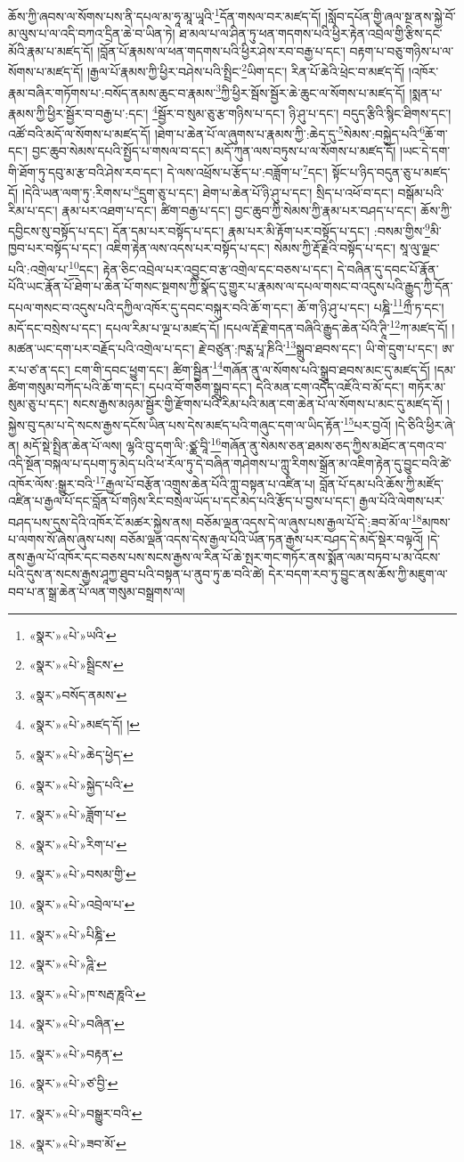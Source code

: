 ཆོས་ཀྱི་ཞབས་ལ་སོགས་པས་ནི་དཔལ་མ་ཧཱ་མཱ་ཡཱའི་\footnote{«སྣར་»«པེ་»ཡའི་}དོན་གསལ་བར་མཛད་དོ། །སློབ་དཔོན་གྱི་ཞལ་སྔ་ནས་སྐྱེ་བོ་མ་ལུས་པ་ལ་འདི་བཀའ་དྲིན་ཆེ་བ་ཡིན་ཏེ། ཐ་མལ་པ་ལ་ཤིན་ཏུ་ཕན་གདགས་པའི་ཕྱིར་རྟེན་འབྲེལ་གྱི་རྩིས་དང་མོའི་རྣམ་པ་མཛད་དོ། །བློན་པོ་རྣམས་ལ་ཕན་གདགས་པའི་ཕྱིར་ཤེས་རབ་བརྒྱ་པ་དང་། བརྟག་པ་བཅུ་གཉིས་པ་ལ་སོགས་པ་མཛད་དོ། །རྒྱལ་པོ་རྣམས་ཀྱི་ཕྱིར་བཤེས་པའི་སྤྲིང་\footnote{«སྣར་»«པེ་»སྦྲིངས་}ཡིག་དང་། རིན་པོ་ཆེའི་ཕྲེང་བ་མཛད་དོ། །འཁོར་རྣམ་བཞིར་གཏོགས་པ་:བསོད་ནམས་ཆུང་བ་རྣམས་\footnote{«སྣར་»བསོད་ནམས་}ཀྱི་ཕྱིར་སྦོས་སྦྱོར་ཆེ་ཆུང་ལ་སོགས་པ་མཛད་དོ། །སྨན་པ་རྣམས་ཀྱི་ཕྱིར་སྦྱོར་བ་བརྒྱ་པ་:དང་། \footnote{«སྣར་»«པེ་»མཛད་དོ། ། }སྦྱོར་བ་སུམ་ཅུ་རྩ་གཉིས་པ་དང་། ཉི་ཤུ་པ་དང་། བདུད་རྩིའི་སྙིང་ཐིགས་དང་། འཚོ་བའི་མདོ་ལ་སོགས་པ་མཛད་དོ། །ཐེག་པ་ཆེན་པོ་ལ་ཞུགས་པ་རྣམས་ཀྱི་:ཆེད་དུ་\footnote{«སྣར་»«པེ་»ཆེད་ཕྱེད་}སེམས་:བསྐྱེད་པའི་\footnote{«སྣར་»«པེ་»སྐྱེད་པའི་}ཆོ་ག་དང་། བྱང་ཆུབ་སེམས་དཔའི་སྤྱོད་པ་གསལ་བ་དང་། མདོ་ཀུན་ལས་བཏུས་པ་ལ་སོགས་པ་མཛད་དོ། །ཡང་དེ་དག་གི་ཐོག་ཏུ་དབུ་མ་རྩ་བའི་ཤེས་རབ་དང་། དེ་ལས་འཕྲོས་པ་རྩོད་པ་:བཟློག་པ་\footnote{«སྣར་»«པེ་»ཟློག་པ་}དང་། སྟོང་པ་ཉིད་བདུན་ཅུ་པ་མཛད་དོ། །དེའི་ཡན་ལག་ཏུ་:རིགས་པ་\footnote{«སྣར་»«པེ་»རིག་པ་}དྲུག་ཅུ་པ་དང་། ཐེག་པ་ཆེན་པོ་ཉི་ཤུ་པ་དང་། སྲིད་པ་འཕོ་བ་དང་། བསྒོམ་པའི་རིམ་པ་དང་། རྣམ་པར་འཐག་པ་དང་། ཚིག་བརྒྱ་པ་དང་། བྱང་ཆུབ་ཀྱི་སེམས་ཀྱི་རྣམ་པར་བཤད་པ་དང་། ཆོས་ཀྱི་དབྱིངས་སུ་བསྟོད་པ་དང་། དོན་དམ་པར་བསྟོད་པ་དང་། རྣམ་པར་མི་རྟོག་པར་བསྟོད་པ་དང་། :བསམ་གྱིས་\footnote{«སྣར་»«པེ་»བསམ་གྱི་}མི་ཁྱབ་པར་བསྟོད་པ་དང་། འཇིག་རྟེན་ལས་འདས་པར་བསྟོད་པ་དང་། སེམས་ཀྱི་རྡོ་རྗེའི་བསྟོད་པ་དང་། སཱ་ལུ་ལྗང་པའི་:འགྲེལ་པ་\footnote{«སྣར་»«པེ་»འབྲེལ་པ་}དང་། རྟེན་ཅིང་འབྲེལ་པར་འབྱུང་བ་རྩ་འགྲེལ་དང་བཅས་པ་དང་། དེ་བཞིན་དུ་དབང་པོ་རྣོན་པོའི་ཡང་རྣོན་པོ་ཐེག་པ་ཆེན་པོ་གསང་སྔགས་ཀྱི་སྣོད་དུ་གྱུར་པ་རྣམས་ལ་དཔལ་གསང་བ་འདུས་པའི་རྒྱུད་ཀྱི་དོན་དཔལ་གསང་བ་འདུས་པའི་དཀྱིལ་འཁོར་དུ་དབང་བསྐུར་བའི་ཆོ་ག་དང་། ཆོ་ག་ཉི་ཤུ་པ་དང་། པཎྜི་\footnote{«སྣར་»«པེ་»པིཎྜི་}ཀྲྀ་ཏ་དང་། མདོ་དང་བསྲེས་པ་དང་། དཔལ་རིམ་པ་ལྔ་པ་མཛད་དོ། །དཔལ་རྡོ་རྗེ་གདན་བཞིའི་རྒྱུད་ཆེན་པོའི་ཊཱི་\footnote{«སྣར་»«པེ་»ཌཱི་}ཀ་མཛད་དོ། །མཚན་ཡང་དག་པར་བརྗོད་པའི་འགྲེལ་པ་དང་། རྗེ་བཙུན་:ཁཪྶ་པཱ་ཎིའི་\footnote{«སྣར་»«པེ་»ཁ་སརྦ་ཎཱའི་}སྒྲུབ་ཐབས་དང་། ཡི་གེ་དྲུག་པ་དང་། ཨ་ར་པ་ཙ་ན་དང་། ངག་གི་དབང་ཕྱུག་དང་། ཚིག་སྦྱིན་\footnote{«སྣར་»«པེ་»བཞིན་}གཞོན་ནུ་ལ་སོགས་པའི་སྒྲུབ་ཐབས་མང་དུ་མཛད་དོ། །དམ་ཚིག་གསུམ་བཀོད་པའི་ཆོ་ག་དང་། དཔའ་བོ་གཅིག་སྒྲུབ་དང་། དེའི་མན་ངག་འདོད་འཇོའི་བ་མོ་དང་། གཏོར་མ་སུམ་ཅུ་པ་དང་། སངས་རྒྱས་མཉམ་སྦྱོར་གྱི་རྫོགས་པའི་རིམ་པའི་མན་ངག་ཆེན་པོ་ལ་སོགས་པ་མང་དུ་མཛད་དོ། །སྐྱེས་བུ་དམ་པ་དེ་སངས་རྒྱས་དངོས་ཡིན་པས་དེས་མཛད་པའི་གཞུང་དག་ལ་ཡིད་རྟོན་\footnote{«སྣར་»«པེ་»བརྟན་}པར་བྱའོ། །དེ་ཅིའི་ཕྱིར་ཞེ་ན། མདོ་སྡེ་སྤྲིན་ཆེན་པོ་ལས། ལྷའི་བུ་དག་ལི་:ཙྪ་བཱི་\footnote{«སྣར་»«པེ་»ཙ་བྱི་}གཞོན་ནུ་སེམས་ཅན་ཐམས་ཅད་ཀྱིས་མཐོང་ན་དགའ་བ་འདི་སྔོན་བསྐལ་པ་དཔག་ཏུ་མེད་པའི་ཕ་རོལ་ཏུ་དེ་བཞིན་གཤེགས་པ་ཀླུ་རིགས་སྒྲོན་མ་འཇིག་རྟེན་དུ་བྱུང་བའི་ཚེ་འཁོར་ལོས་:སྒྱུར་བའི་\footnote{«སྣར་»«པེ་»བསྒྱུར་བའི་}རྒྱལ་པོ་བརྩོན་འགྲུས་ཆེན་པོའི་ཀླུ་བསྟན་པ་འཛིན་པ། བློན་པོ་དམ་པའི་ཆོས་ཀྱི་མཛོད་འཛིན་པ་རྒྱལ་པོ་དང་བློན་པོ་གཉིས་རིང་བསྲེལ་ཡོད་པ་དང་མེད་པའི་རྩོད་པ་བྱས་པ་དང་། རྒྱལ་པོའི་ལེགས་པར་བཤད་པས་དུས་དེའི་འཁོར་ངོ་མཚར་སྐྱེས་ནས། བཅོམ་ལྡན་འདས་དེ་ལ་ཞུས་པས་རྒྱལ་པོ་དེ་:ཟབ་མོ་ལ་\footnote{«སྣར་»«པེ་»ཟབ་མོ་}མཁས་པ་ལགས་སོ་ཞེས་ཞུས་པས། བཅོམ་ལྡན་འདས་དེས་རྒྱལ་པོའི་ཡོན་ཏན་རྒྱས་པར་བཤད་དེ་མདོ་སྡེར་བལྟའོ། །དེ་ནས་རྒྱལ་པོ་འཁོར་དང་བཅས་པས་སངས་རྒྱས་ལ་རིན་པོ་ཆེ་སྤར་གང་གཏོར་ནས་སྨོན་ལམ་བཏབ་པ་མ་འོངས་པའི་དུས་ན་སངས་རྒྱས་ཤཱཀྱ་ཐུབ་པའི་བསྟན་པ་ནུབ་ཏུ་ཆ་བའི་ཚེ། དེར་བདག་རབ་ཏུ་བྱུང་ནས་ཆོས་ཀྱི་མཇུག་ལ་བབ་པ་ན་སྒྲ་ཆེན་པོ་ལན་གསུམ་བསྒྲགས་ལ། 